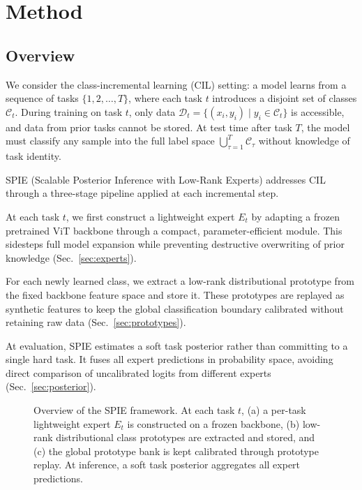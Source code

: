 \section{Method}
\label{sec:method}

\subsection{Overview}
\label{sec:overview}

We consider the class-incremental learning (CIL) setting: a model learns from a sequence of tasks $\{1, 2, \dots, T\}$, where each task $t$ introduces a disjoint set of classes $\mathcal{C}_t$. During training on task $t$, only data $\mathcal{D}_t = \{(x_i, y_i) \mid y_i \in \mathcal{C}_t\}$ is accessible, and data from prior tasks cannot be stored. At test time after task $T$, the model must classify any sample into the full label space $\bigcup_{\tau=1}^{T} \mathcal{C}_\tau$ without knowledge of task identity.

SPIE (Scalable Posterior Inference with Low-Rank Experts) addresses CIL through a three-stage pipeline applied at each incremental step.

At each task $t$, we first construct a lightweight expert $E_t$ by adapting a frozen pretrained ViT backbone through a compact, parameter-efficient module. This sidesteps full model expansion while preventing destructive overwriting of prior knowledge (Sec.~\ref{sec:experts}).

For each newly learned class, we extract a low-rank distributional prototype from the fixed backbone feature space and store it. These prototypes are replayed as synthetic features to keep the global classification boundary calibrated without retaining raw data (Sec.~\ref{sec:prototypes}).

At evaluation, SPIE estimates a soft task posterior rather than committing to a single hard task. It fuses all expert predictions in probability space, avoiding direct comparison of uncalibrated logits from different experts (Sec.~\ref{sec:posterior}).

\begin{figure}[t]
\centering
\caption{Overview of the SPIE framework. At each task $t$, (a) a per-task lightweight expert $E_t$ is constructed on a frozen backbone, (b) low-rank distributional class prototypes are extracted and stored, and (c) the global prototype bank is kept calibrated through prototype replay. At inference, a soft task posterior aggregates all expert predictions.}
\label{fig:pipeline}
\end{figure}

